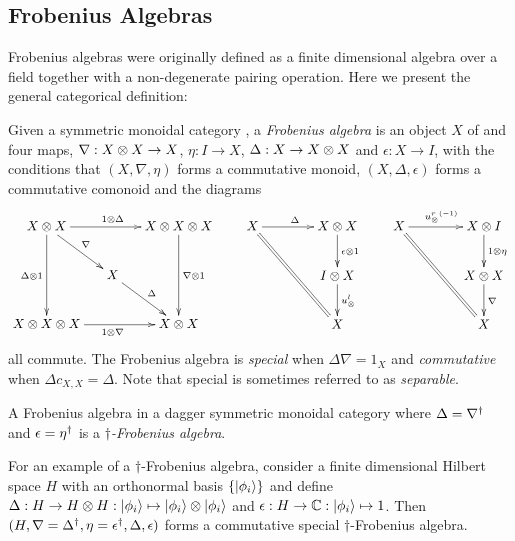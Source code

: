 \subsection{Frobenius Algebras} %
\label{sub:frobenius_algebras}
Frobenius algebras were originally defined as a finite dimensional algebra over a field together with a
non-degenerate pairing operation. Here we present the general categorical definition:

\begin{definition}\label{def:frobeniusalgebra}
  Given a symmetric monoidal category \cD, a \emph{Frobenius algebra} is an object $X$ of \cD and
  four maps, $\nabla :X\otimes X \to X$, $\eta: I \to X$, $\Delta: X\to X\otimes X$ and $\epsilon:X\to I$, with
  the conditions that $(X,\nabla,\eta)$ forms a commutative monoid, $(X,\Delta, \epsilon)$ forms a
  commutative comonoid and the diagrams
  \[
    \xymatrix@C-10pt{
      X\*X \ar[rr]^{1\*\Delta} \ar[dd]_{\Delta \* 1} \ar[dr]^{\nabla}
        && X\*X\*X \ar[dd]^{\nabla\*1}\\
      & X\ar[dr]^{\Delta}\\
      X\*X\*X\ar[rr]_{1\*\nabla}  && X\*X
    }\qquad
    \xymatrix@C+15pt{
      X \ar[r]^{\Delta} \ar@{=}[ddr] & X\*X \ar[d]^{\epsilon\*1} \\
      & I\*X \ar[d]^{\usl}\\
      & X
    }\qquad
    \xymatrix@C+15pt{
      X \ar[r]^{\inv{\usr}} \ar@{=}[ddr] & X\*I \ar[d]^{1\*\eta}\\
      & X\*X \ar[d]^{\nabla} \\
      & X
    }
  \]
  all commute. The Frobenius algebra is \emph{special} when $\Delta \nabla = 1_{X}$ and
  \emph{commutative} when $\Delta c_{X,X} = \Delta$. Note that special is sometimes referred to as
  \emph{separable}.
\end{definition}
\begin{definition}\label{def:daggerfrob}
  A Frobenius algebra in a dagger symmetric monoidal category where $\Delta = {\nabla}^{\dagger}$ and
  $\epsilon={\eta}^{\dagger}$ is a $\dagger$\emph{-Frobenius algebra}.
\end{definition}
For an example of a $\dagger$-Frobenius algebra, consider a finite dimensional Hilbert space $H$
with an orthonormal basis $\{\left\vert{\phi_{i}}\right\rangle\}$ and define $\Delta:H\to H\otimes H: \left\vert{\phi_{i}}\right\rangle\mapsto
\left\vert{\phi_{i}}\right\rangle \otimes \left\vert{\phi_{i}}\right\rangle$ and $\epsilon : H\to \mathbb{C} : \left\vert{\phi_{i}}\right\rangle \mapsto 1$. Then $(H,
\nabla={\Delta}^{\dagger}, \eta={\epsilon}^{\dagger}, \Delta, \epsilon)$ forms a commutative special
$\dagger$-Frobenius algebra.


